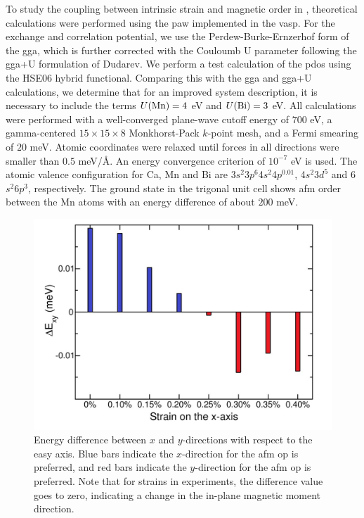 To study the coupling between intrinsic strain and magnetic order in \cmb, theoretical calculations were performed using the \gls{paw} implemented in the \gls{vasp}\citep{kresse_efficient_1996, kresse_from_1999}.
For the exchange and correlation potential, we use the Perdew-Burke-Ernzerhof form of the \gls{gga}, which is further corrected with the Couloumb U parameter following the \gls{gga}+U formulation of Dudarev\citep{dudarev_electron-energy-loss_1998}.
We perform a test calculation of the \gls{pdos} using the HSE06 hybrid functional.
Comparing this with the \gls{gga} and \gls{gga}+U calculations, we determine that for an improved system description, it is necessary to include the terms $U(\ce{Mn})=4$ \si{eV} and $U(\ce{Bi})=3$ \si{eV}.
All calculations were performed with a well-converged plane-wave cutoff energy of $700$ \si{eV}, a gamma-centered $15\times15\times8$ Monkhorst-Pack $k$-point mesh, and a Fermi smearing of $20$ \si{meV}.
Atomic coordinates were relaxed until forces in all directions were smaller than $0.5$ \si{meV/\r{A}}.
An energy convergence criterion of $10^{-7}$ \si{eV} is used.
The atomic valence configuration for Ca, Mn and Bi are 3$s^2$3$p^6$4$s^2$4$p^{0.01}$, 4$s^2$3$d^5$ and 6$s^2$6$p^3$, respectively.
The ground state in the trigonal unit cell shows \gls{afm} order between the Mn atoms with an energy difference of about $200$ \si{meV}.

\begin{figure}
\centering
\includegraphics[width=\textwidth]{./gfx/ch6/equilibriumtheory.pdf}
\caption{
\label{fig:equilibriumtheory}
Energy difference between $x$ and $y$-directions with respect to the easy axis.
Blue bars indicate the $x$-direction for the \gls{afm} \gls{op} is preferred, and red bars indicate the $y$-direction for the \gls{afm} \gls{op} is preferred.
Note that for strains in experiments, the difference value goes to zero, indicating a change in the in-plane magnetic moment direction.
}
\end{figure}

